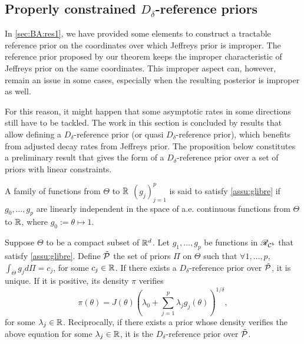 \subsection{Properly constrained $D_\delta$-reference priors}\label{sec:BA:res2}



In \cref{sec:BA:res1}, we have provided some elements to construct a tractable reference prior on the coordinates over which Jeffreys prior is improper.
The reference prior proposed by our theorem
keeps the improper characteristic of Jeffreys prior on the same coordinates.
This improper aspect can, however, remain an issue in some cases, especially when the resulting posterior is improper as well.

For this reason, it might happen that some asymptotic rates in some directions still have to be tackled. The work in this section is concluded by results that allow defining a $D_\delta$-reference prior (or quasi $D_\delta$-reference prior), which benefits from adjusted decay rates from Jeffreys prior. 
The proposition below constitutes a preliminary result that gives the form of a $D_\delta$-reference prior over a set of priors with linear constraints.

\begin{assu}\label{assu:glibre}
    A family of functions from $\Theta$ to $\mathbb{R}$ $(g_j)_{j=1}^p$ is said to satisfy \cref{assu:glibre} if $g_0,\dots,g_p$ are linearly independent in the space of a.e. continuous functions from $\Theta$ to $\mathbb{R}$, where $g_0:=\theta\mapsto 1$.
\end{assu}

\begin{prop}\label{prop:constraints}
    Suppose $\Theta$ to be a compact subset of $\mathbb{R}^d$. Let $g_1,\dots,g_p$ be %
    functions in $\mathscr{R}_{\mathcal{C}^b}$ %
    that satisfy \cref{assu:glibre}. Define $\tilde{\mathcal{P}}$ the set of priors $\varPi$ on $\Theta$ such that $\forall 1,\dots,p$, $\int_\Theta g_jd\varPi=c_j$, for some $c_j\in\mathbb{R}$.
    If %
    there exists a $D_\delta$-reference prior over $\tilde{\mathcal{P}}$, it is unique. If it is positive, its density $\pi$ verifies
    \begin{equation}
        \pi(\theta) = J(\theta)\left(\lambda_0+\sum_{j=1}^p\lambda_jg_j(\theta) \right)^{1/\delta},
    \end{equation}
    for some $\lambda_j\in\mathbb{R}$. Reciprocally, if there exists a prior %
    whose density verifies the above equation for some $\lambda_j\in\mathbb{R}$, it is the $D_\delta$-reference prior over $\tilde{\mathcal{P}}$.
\end{prop}

